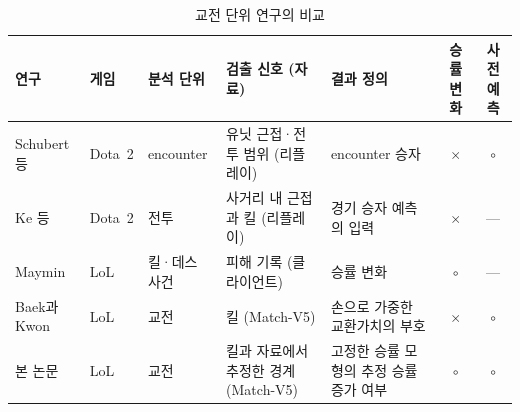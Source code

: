 \begin{table}[!t]
  \centering
  \caption{교전 단위 연구의 비교}
  \label{tab:related-compare}
  \footnotesize
  \begin{tabularx}{\linewidth}{@{}>{\raggedright\arraybackslash}p{2.5cm}>{\raggedright\arraybackslash}p{1.2cm}>{\raggedright\arraybackslash}p{1.7cm}>{\raggedright\arraybackslash}p{2.9cm}Xcc@{}}
    \toprule
    연구 & 게임 & 분석 단위 & 검출 신호 (자료) & 결과 정의 & 승률 변화 & 사전 예측 \\
    \midrule
    Schubert 등 \cite{schubert2016encounter} & Dota~2 & encounter & 유닛 근접·전투 범위 (리플레이) & encounter 승자 & $\times$ & $\circ$ \\
    Ke 등 \cite{ke2022} & Dota~2 & 전투 & 사거리 내 근접과 킬 (리플레이) & 경기 승자 예측의 입력 & $\times$ & --- \\
    Maymin \cite{maymin2021smart} & LoL & 킬·데스 사건 & 피해 기록 (클라이언트) & 승률 변화 & $\circ$ & --- \\
    Baek과 Kwon \cite{baek2026killconditioned} & LoL & 교전 & 킬 (Match-V5) & 손으로 가중한 교환가치의 부호 & $\times$ & $\circ$ \\
    본 논문 & LoL & 교전 & 킬과 자료에서 추정한 경계 (Match-V5) & 고정한 승률 모형의 추정 승률 증가 여부 & $\circ$ & $\circ$ \\
    \bottomrule
  \end{tabularx}
\end{table}
